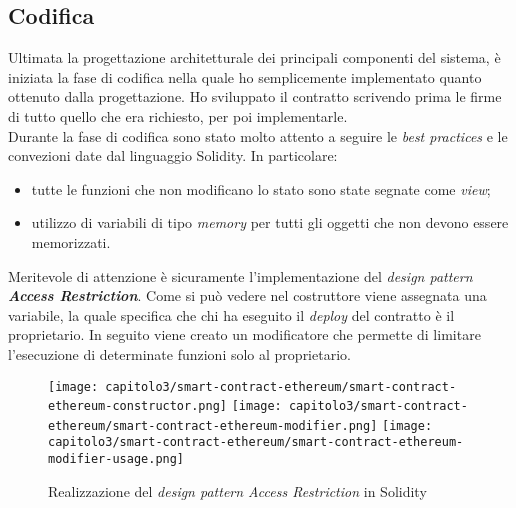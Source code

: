\subsection{Codifica}
Ultimata la progettazione architetturale dei principali componenti del sistema, è iniziata la fase di codifica nella quale ho semplicemente implementato quanto ottenuto dalla progettazione. Ho sviluppato il contratto scrivendo prima le firme di tutto quello che era richiesto, per poi implementarle. \\

Durante la fase di codifica sono stato molto attento a seguire le \textit{best practices} e le convezioni date dal linguaggio Solidity. In particolare:
\begin{itemize}
  \item tutte le funzioni che non modificano lo stato sono state segnate come \textit{view};
  \item utilizzo di variabili di tipo \textit{memory} per tutti gli oggetti che non devono essere memorizzati.
\end{itemize}



Meritevole di attenzione è sicuramente l'implementazione del \textit{design pattern \textbf{Access Restriction}}. Come si può vedere nel costruttore viene assegnata una variabile, la quale specifica che chi ha eseguito il \textit{deploy} del contratto è il proprietario. In seguito viene creato un modificatore che permette di limitare l'esecuzione di determinate funzioni solo al proprietario.

\begin{figure}[h!]
  \centering
  \texttt{[image: capitolo3/smart-contract-ethereum/smart-contract-ethereum-constructor.png]}
  \texttt{[image: capitolo3/smart-contract-ethereum/smart-contract-ethereum-modifier.png]}
  \texttt{[image: capitolo3/smart-contract-ethereum/smart-contract-ethereum-modifier-usage.png]}
  \caption{Realizzazione del \textit{design pattern Access Restriction} in Solidity}
\end{figure}

